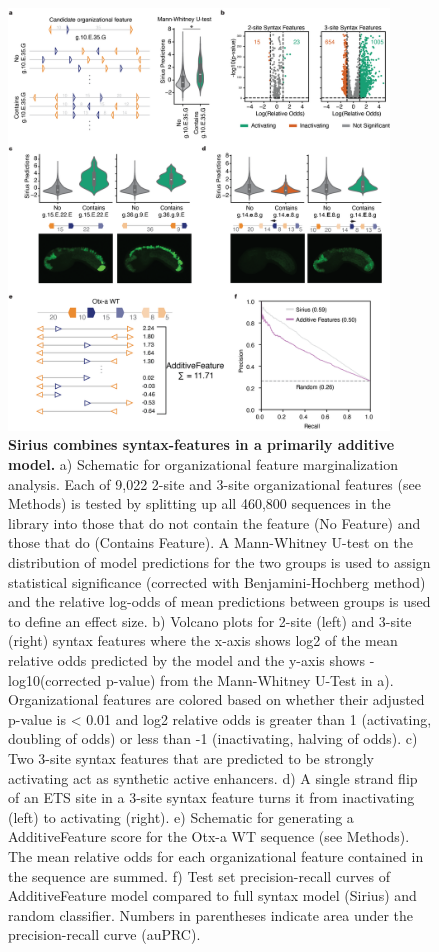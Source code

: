 \begin{figure}[p]
    \centering
    \includegraphics[width=0.9\textwidth, height=0.745\textheight]{2_figures-and-files/Fig3.png}
    \caption[Sirius combines syntax-features in a primarily additive model.]{\textbf{Sirius combines syntax-features in a primarily additive model.} a) Schematic for organizational feature marginalization analysis. Each of 9,022 2-site and 3-site organizational features (see Methods) is tested by splitting up all 460,800 sequences in the library into those that do not contain the feature (No Feature) and those that do (Contains Feature). A Mann-Whitney U-test on the distribution of model predictions for the two groups is used to assign statistical significance (corrected with Benjamini-Hochberg method) and the relative log-odds of mean predictions between groups is used to define an effect size. b) Volcano plots for 2-site (left) and 3-site (right) syntax features where the x-axis shows log2 of the mean relative odds predicted by the model and the y-axis shows -log10(corrected p-value) from the Mann-Whitney U-Test in a). Organizational features are colored based on whether their adjusted p-value is < 0.01 and log2 relative odds is greater than 1 (activating, doubling of odds) or less than -1 (inactivating, halving of odds). c) Two 3-site syntax features that are predicted to be strongly activating act as synthetic active enhancers. d) A single strand flip of an ETS site in a 3-site syntax feature turns it from inactivating (left) to activating (right). e) Schematic for generating a AdditiveFeature score for the Otx-a WT sequence (see Methods). The mean relative odds for each organizational feature contained in the sequence are summed. f) Test set precision-recall curves of AdditiveFeature model compared to full syntax model (Sirius) and random classifier. Numbers in parentheses indicate area under the precision-recall curve (auPRC).}
    \label{fig:2 Figure 3}
\end{figure}

